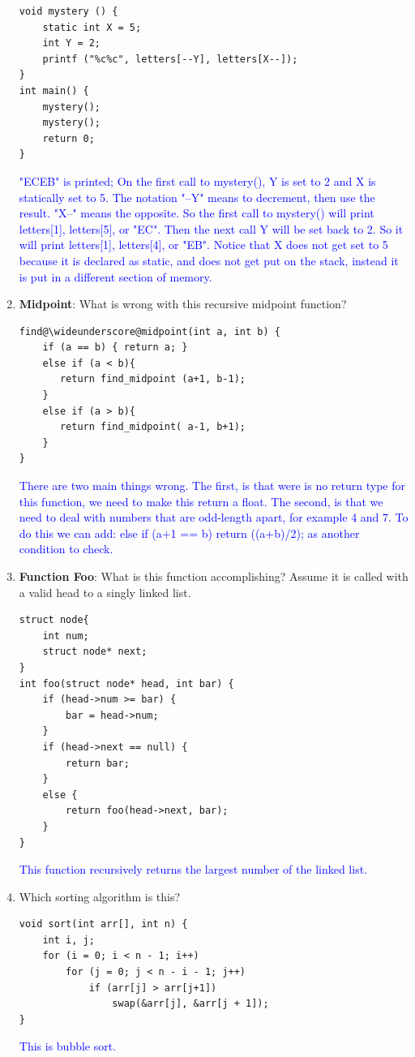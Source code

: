 \documentclass{article}
\begin{document}
\begin{enumerate}[label=(\alph*)]
\begin{lstlisting}[style=CStyle]
void mystery () {
    static int X = 5;
    int Y = 2;
    printf ("%c%c", letters[--Y], letters[X--]);
}
int main() {
    mystery();
    mystery();
    return 0;
}
 \end{lstlisting}
    \textcolor{blue}{"ECEB" is printed; On the first call to mystery(), Y is set to 2 and X is statically set to 5. The notation "--Y" means to decrement, then use the result. "X--" means the opposite. So the first call to mystery() will print letters[1], letters[5], or "EC". Then the next call Y will be set back to 2. So it will print letters[1], letters[4], or "EB". Notice that X does not get set to 5 because it is declared as static, and does not get put on the stack, instead it is put in a different section of memory.
    }
    \newpage
    \item \textbf{Midpoint}: What is wrong with this recursive midpoint function?
\begin{lstlisting}[style=CStyle] 
find@\wideunderscore@midpoint(int a, int b) {
    if (a == b) { return a; }
    else if (a < b){
       return find_midpoint (a+1, b-1);
    } 
    else if (a > b){
       return find_midpoint( a-1, b+1); 
    } 
}\end{lstlisting}  
    \textcolor{blue}{There are two main things wrong. The first, is that were is no return type for this function, we need to make this return a float. The second, is that we need to deal with numbers that are odd-length apart, for example 4 and 7. To do this we can add: else if (a+1 == b) {return ((a+b)/2);} as another condition to check. }
    \item \textbf{Function Foo}: What is this function accomplishing? Assume it is called with a valid head to a singly linked list.
\begin{lstlisting}[style=CStyle] 
struct node{
    int num;
    struct node* next;
}
int foo(struct node* head, int bar) {
    if (head->num >= bar) {
        bar = head->num;
    }
    if (head->next == null) {
        return bar;
    }
    else {
        return foo(head->next, bar);
    }
}\end{lstlisting}  
    \textcolor{blue}{This function recursively returns the largest number of the linked list.}

\item Which sorting algorithm is this?
\begin{lstlisting}[style=CStyle]
void sort(int arr[], int n) {
    int i, j;
    for (i = 0; i < n - 1; i++)
        for (j = 0; j < n - i - 1; j++)
            if (arr[j] > arr[j+1])
                swap(&arr[j], &arr[j + 1]);
}\end{lstlisting}
\textcolor{blue}{This is bubble sort.}
    

\end{enumerate}
\end{document}
